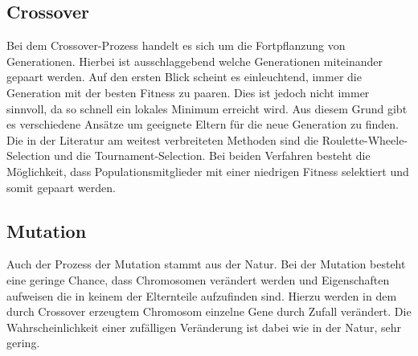 \subsection{Crossover}
\label{chap:grundlagen_cossover}
Bei dem Crossover-Prozess handelt es sich um die Fortpflanzung von Generationen. Hierbei ist ausschlaggebend welche Generationen miteinander gepaart werden. Auf den ersten Blick scheint es einleuchtend, immer die Generation mit der besten Fitness zu paaren. Dies ist jedoch nicht immer sinnvoll, da so schnell ein lokales Minimum erreicht wird. Aus diesem Grund gibt es verschiedene Ansätze um geeignete Eltern für die neue Generation zu finden.\cite{davis1991handbook}
Die in der Literatur am weitest verbreiteten Methoden sind die Roulette-Wheele-Selection und die Tournament-Selection.\cite{zhong2005comparison} Bei beiden Verfahren besteht die Möglichkeit, dass Populationsmitglieder mit einer niedrigen Fitness selektiert und somit gepaart werden.

\subsection{Mutation}
Auch der Prozess der Mutation stammt aus der Natur. Bei der Mutation besteht eine geringe Chance, dass Chromosomen verändert werden und Eigenschaften aufweisen die in keinem der Elternteile aufzufinden sind. Hierzu werden in dem durch Crossover erzeugtem Chromosom einzelne Gene durch Zufall verändert. Die Wahrscheinlichkeit einer zufälligen Veränderung ist dabei wie in der Natur, sehr gering.\cite{davis1991handbook}

